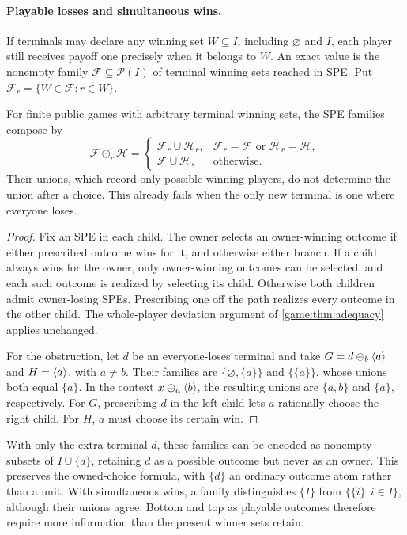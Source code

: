 \paragraph{Playable losses and simultaneous wins.}
If terminals may declare any winning set $W\subseteq I$, including
$\varnothing$ and $I$, each player still receives payoff one precisely
when it belongs to $W$. An exact value is the nonempty family
$\mathcal F\subseteq\mathcal P(I)$ of terminal winning sets reached
in SPE. Put $\mathcal F_r=\{W\in\mathcal F:r\in W\}$.

\begin{proposition}\label{context:prop:outcome-families}
For finite public games with arbitrary terminal winning sets, the SPE
families compose by
\[
 \mathcal F\mathbin{\odot_r}\mathcal H=
 \begin{cases}
 \mathcal F_r\cup\mathcal H_r,
   &\mathcal F_r=\mathcal F\text{ or }\mathcal H_r=\mathcal H,\\
 \mathcal F\cup\mathcal H,&\text{otherwise}.
 \end{cases}
\]
Their unions, which record only possible winning players, do not
determine the union after a choice. This already fails when the only
new terminal is one where everyone loses.
\end{proposition}
\begin{proof}
Fix an SPE in each child. The owner selects an owner-winning outcome
if either prescribed outcome wins for it, and otherwise either branch.
If a child always wins for the owner, only owner-winning outcomes can
be selected, and each such outcome is realized by selecting its child.
Otherwise both children admit owner-losing SPEs. Prescribing one off
the path realizes every outcome in the other child. The whole-player
deviation argument of \cref{game:thm:adequacy} applies unchanged.

For the obstruction, let $d$ be an everyone-loses terminal and take
$G=d\mathbin{\oplus_{b}}\langle a\rangle$ and $H=\langle a\rangle$, with $a\ne b$. Their families are
$\{\varnothing,\{a\}\}$ and $\{\{a\}\}$, whose unions both equal
$\{a\}$. In the context $x\mathbin{\oplus_{a}}\langle b\rangle$, the resulting unions are
$\{a,b\}$ and $\{a\}$, respectively. For $G$, prescribing $d$ in
the left child lets $a$ rationally choose the right child. For $H$,
$a$ must choose its certain win.
\end{proof}

With only the extra terminal $d$, these families can be encoded as
nonempty subsets of $I\cup\{d\}$, retaining $d$ as a possible outcome
but never as an owner. This preserves the owned-choice formula, with
$\{d\}$ an ordinary outcome atom rather than a unit. With simultaneous
wins, a family distinguishes $\{I\}$ from
$\{\{i\}:i\in I\}$, although their unions agree. Bottom and top as
playable outcomes therefore require more information than the present
winner sets retain.

